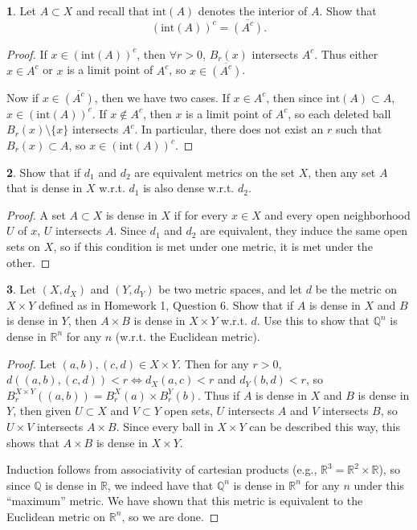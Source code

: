 \documentclass[12pt]{article}
\theoremstyle{definition}
\newtheorem{ex}{}
\begin{document}
\begin{ex}
	Let $A \subset X$ and recall that $\mathrm{int}(A)$ denotes the interior of $A$.
	Show that \begin{equation*}
		(\mathrm{int}(A))^c = \overline{(A^c)}.
	\end{equation*}
\end{ex}
\begin{proof}
	If $x \in (\mathrm{int}(A))^c$, then $\forall r > 0$, $B_r(x)$ intersects $A^c$.
  Thus either $x \in A^c$ or $x$ is a limit point of $A^c$, so $x \in \overline{(A^c)}$.

  Now if $x \in \overline{(A^c)}$, then we have two cases.
  If $x \in A^c$, then since $\mathrm{int}(A) \subset A$, $x \in (\mathrm{int}(A))^c$.
  If $x \notin A^c$, then $x$ is a limit point of $A^c$, so each deleted ball $B_r(x) \setminus \lbrace x \rbrace$ intersects $A^c$.
  In particular, there does not exist an $r$ such that $B_r(x) \subset A$, so $x \in (\mathrm{int}(A))^c$.
\end{proof}

\begin{ex}
	Show that if $d_1$ and $d_2$ are equivalent metrics on the set $X$, then any set $A$ that is dense in $X$ w.r.t. $d_1$ is also dense w.r.t. $d_2$.
\end{ex}
\begin{proof}
  A set $A \subset X$ is dense in $X$ if for every $x \in X$ and every open neighborhood $U$ of $x$, $U$ intersects $A$.
  Since $d_1$ and $d_2$ are equivalent, they induce the same open sets on $X$, so if this condition is met under one metric, it is met under the other.
\end{proof}

\begin{ex}
	Let $(X, d_X)$ and $(Y, d_Y)$ be two metric spaces, and let $d$ be the metric on $X \times Y$ defined as in Homework 1, Question 6.
	Show that if $A$ is dense in $X$ and $B$ is dense in $Y$, then $A \times B$ is dense in $X \times Y$ w.r.t. $d$.
	Use this to show that $\mathbb{Q}^n$ is dense in $\mathbb{R}^n$ for any $n$ (w.r.t. the Euclidean metric).
\end{ex}
\begin{proof}
  Let $(a, b), (c, d) \in X \times Y$.
  Then for any $r > 0$, $d((a, b), (c, d)) < r \iff d_X(a, c) < r$ and $d_Y(b, d) < r$, so $B_r^{X\times Y}((a, b)) = B_r^{X}(a) \times B_r^Y(b)$.
  Thus if $A$ is dense in $X$ and $B$ is dense in $Y$, then given $U \subset X$ and $V \subset Y$ open sets, $U$ intersects $A$ and $V$ intersects $B$, so $U \times V$ intersects $A \times B$.
  Since every ball in $X \times Y$ can be described this way, this shows that $A \times B$ is dense in $X \times Y$.

  Induction follows from associativity of cartesian products (e.g., $\mathbb{R}^3 = \mathbb{R}^2 \times \mathbb{R}$), so since $\mathbb{Q}$ is dense in $\mathbb{R}$, we indeed have that $\mathbb{Q}^n$ is dense in $\mathbb{R}^n$ for any $n$ under this ``maximum'' metric.
  We have shown that this metric is equivalent to the Euclidean metric on $\mathbb{R}^n$, so we are done.
\end{proof}
\end{document}
